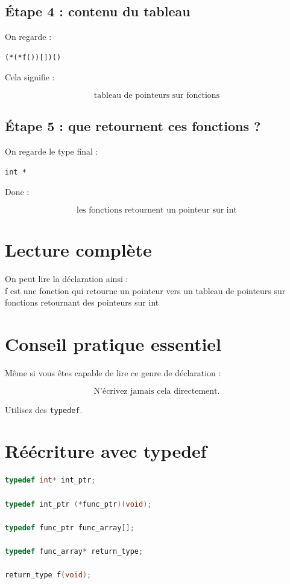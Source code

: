 \subsection{Étape 4 : contenu du tableau}

On regarde :

\begin{lstlisting}
(*(*f())[])()
\end{lstlisting}

Cela signifie :

\[
\text{tableau de pointeurs sur fonctions}
\]

\subsection{Étape 5 : que retournent ces fonctions ?}

On regarde le type final :

\begin{lstlisting}
int *
\end{lstlisting}

Donc :

\[
\text{les fonctions retournent un pointeur sur int}
\]

\section{Lecture complète}

On peut lire la déclaration ainsi : \\

f est une fonction qui retourne un pointeur vers un tableau de pointeurs sur fonctions retournant des pointeurs sur int

\section{Conseil pratique essentiel}

Même si vous êtes capable de lire ce genre de déclaration :

\[
\boxed{\text{N’écrivez jamais cela directement.}}
\]

Utilisez des \texttt{typedef}.

\section{Réécriture avec typedef}

\begin{lstlisting}[language=C]
typedef int* int_ptr;

typedef int_ptr (*func_ptr)(void);

typedef func_ptr func_array[];

typedef func_array* return_type;

return_type f(void);
\end{lstlisting}

